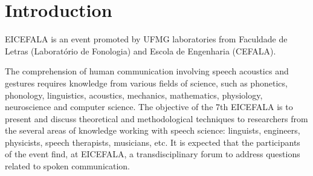 \documentclass[nohyper,b5paper,openany]{tufte-book}
\let\cleardoublepage=\clearpage
\begin{document}
\tableofcontents





\cleardoublepage
\chapter*{Introduction}
EICEFALA is an event promoted by UFMG laboratories from Faculdade de Letras
(Laboratório de Fonologia) and Escola de Engenharia (CEFALA).

The comprehension of human communication involving speech acoustics and
gestures requires knowledge from various fields of science, such as phonetics,
phonology, linguistics, acoustics, mechanics, mathematics, physiology,
neuroscience and computer science. The objective of the 7th EICEFALA is to
present and discuss theoretical and methodological techniques to researchers
from the several areas of knowledge working with speech science: linguists,
engineers, physicists, speech therapists, musicians, etc. It is expected that
the participants of the event find, at EICEFALA, a transdisciplinary forum to
address questions related to spoken communication.


\mainmatter

\end{document}
